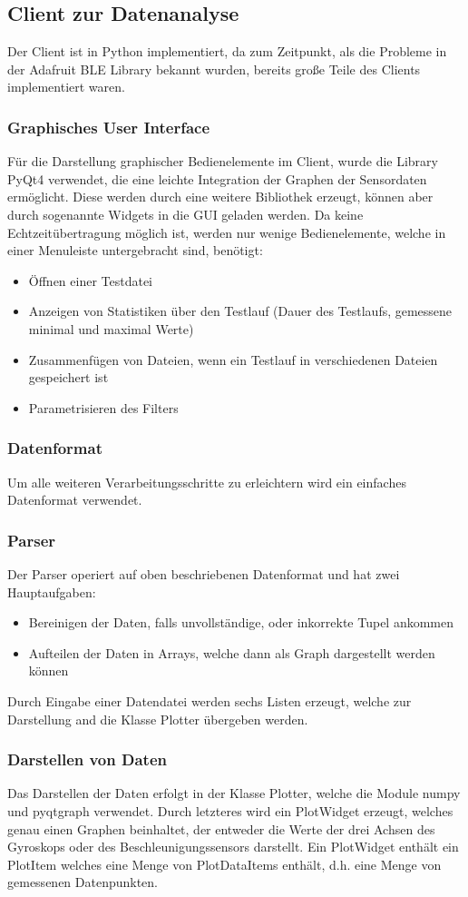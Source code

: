 \subsection{Client zur Datenanalyse}
Der Client ist in Python implementiert, da zum Zeitpunkt, als die Probleme in der Adafruit BLE Library bekannt wurden, bereits große Teile des Clients implementiert waren.
\subsubsection{Graphisches User Interface}
Für die Darstellung graphischer Bedienelemente im Client, wurde die Library PyQt4 verwendet, die eine leichte Integration der Graphen der Sensordaten ermöglicht. Diese werden durch eine weitere Bibliothek erzeugt, können aber durch sogenannte Widgets in die GUI geladen werden.
Da keine Echtzeitübertragung möglich ist, werden nur wenige Bedienelemente, welche in einer Menuleiste untergebracht sind, benötigt:
\begin{itemize}
\item Öffnen einer Testdatei
\item Anzeigen von Statistiken über den Testlauf (Dauer des Testlaufs, gemessene minimal und maximal Werte)
\item Zusammenfügen von Dateien, wenn ein Testlauf in verschiedenen Dateien gespeichert ist
\item Parametrisieren des Filters
\end{itemize}
\subsubsection{Datenformat}
Um alle weiteren Verarbeitungsschritte zu erleichtern wird ein einfaches Datenformat verwendet.
\subsubsection{Parser}
Der Parser operiert auf oben beschriebenen Datenformat und hat zwei Hauptaufgaben:
\begin{itemize}
 \item Bereinigen der Daten, falls unvollständige, oder inkorrekte Tupel ankommen
 \item Aufteilen der Daten in Arrays, welche dann als Graph dargestellt werden können
\end{itemize}
Durch Eingabe einer Datendatei werden sechs Listen erzeugt, welche zur Darstellung and die Klasse Plotter übergeben werden.
\subsubsection{Darstellen von Daten}
Das Darstellen der Daten erfolgt in der Klasse Plotter, welche die Module numpy und pyqtgraph verwendet. Durch letzteres wird ein PlotWidget erzeugt, welches genau einen Graphen beinhaltet, der entweder die Werte der drei Achsen des Gyroskops oder des Beschleunigungssensors darstellt.
Ein PlotWidget enthält ein PlotItem welches eine Menge von PlotDataItems enthält, d.h. eine Menge von gemessenen Datenpunkten.
